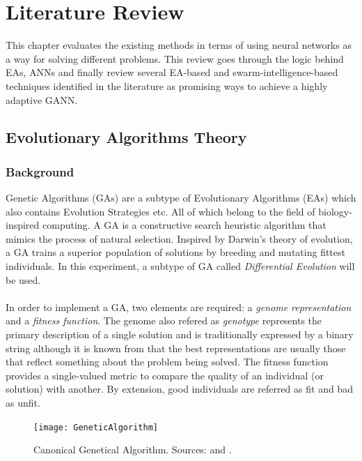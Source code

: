 \documentclass[a4paper,12pt, oneside]{memoir}
\begin{document}
\begin{description}
\end{description}

\chapter{Literature Review}
This chapter evaluates the existing methods in terms of using neural networks as a way for solving different problems. This review goes through the logic behind EAs, ANNs and finally review several EA-based and swarm-intelligence-based techniques identified in the literature as promising ways to achieve a highly adaptive GANN.

\newpage

\section{Evolutionary Algorithms Theory}

\subsection{Background}
Genetic Algorithms (GAs) are a subtype of Evolutionary Algorithms (EAs) which also contains Evolution Strategies etc. All of which belong to the field of biology-inspired computing. A GA is a constructive search heuristic algorithm that mimics the process of natural selection. Inspired by Darwin's theory of evolution, a GA trains a superior population of solutions by breeding and mutating fittest individuals. In this experiment, a subtype of GA called \textit{Differential Evolution} will be used.
\\ \\
In order to implement a GA, two elements are required: a \textit{genome representation} and a \textit{fitness function}. The genome also refered as \textit{genotype} represents the primary description of a single solution and is traditionally expressed by a binary string although it is known from \cite{wikipedia-evolutionary-algorithms} that the best representations are usually those that reflect something about the problem being solved. The fitness function provides a single-valued metric to compare the quality of an individual (or solution) with another. By extension, good individuals are referred as fit and bad as unfit.

\setlength{\columnsep}{20pt}
\begin{figure}
  \hspace{100pt}
  \begin{center}
    \texttt{[image: GeneticAlgorithm]}
  \end{center}
  \vspace{-20pt}
  \caption{Canonical Genetical Algorithm. Sources: \cite{haupt-1998} and \cite{negnevitsky-2011}.}
  \label{GA-flowchart}
\vspace{-40pt}
\end{figure}
\hspace{0pt}
\end{document}

